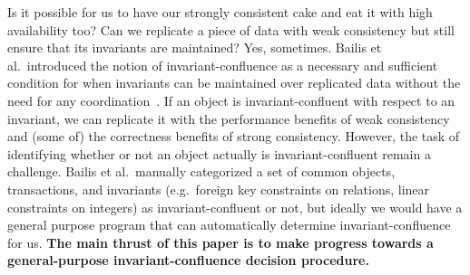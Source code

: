 Is it possible for us to have our strongly consistent cake and eat it with high
availability too? Can we replicate a piece of data with weak consistency but
still ensure that its invariants are maintained? Yes, sometimes. Bailis et al.\
introduced the notion of invariant-confluence as a necessary and sufficient
condition for when invariants can be maintained over replicated data without
the need for any coordination~\cite{bailis2014coordination}. If an object is
invariant-confluent with respect to an invariant, we can replicate it with the
performance benefits of weak consistency and (some of) the correctness benefits
of strong consistency. However, the task of identifying whether or not an
object actually is invariant-confluent remain a challenge. Bailis et al.\
manually categorized a set of common objects, transactions, and invariants
(e.g.\ foreign key constraints on relations, linear constraints on integers) as
invariant-confluent or not, but ideally we would have a general purpose program
that can automatically determine invariant-confluence for us. \textbf{The main
thrust of this paper is to make progress towards a general-purpose
invariant-confluence decision procedure.}


